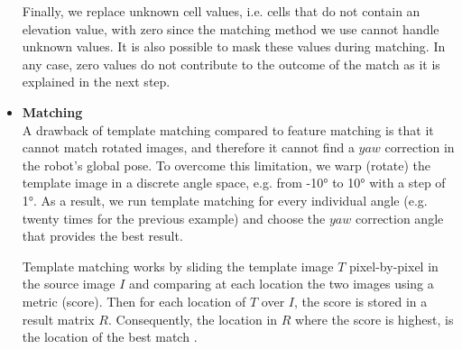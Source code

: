 \begin{itemize}

        Finally, we replace unknown cell values, i.e. cells that do not
        contain an elevation value, with zero since the matching
        method we use cannot handle unknown values. It is also possible
        to mask these values during matching. In any case, zero values
        do not contribute to the outcome of the match as it is explained
        in the next step.

    \item \textbf{Matching} \\
        A drawback of template matching compared to feature matching is that
        it cannot match rotated images, and therefore it cannot find a
        $yaw$ correction in the robot's global pose.
        To overcome this limitation, we warp (rotate) the template image
        in a discrete angle space, e.g. from \ang{-10} to \ang{10} with
        a step of \ang{1}. As a result, we run template matching for every
        individual angle (e.g. twenty times for the previous example) and
        choose the $yaw$ correction angle that provides the best result.

        Template matching works by sliding the template image $T$
        pixel-by-pixel in the source image $I$ and comparing at each
        location the two images using a metric (score).
        Then for each location of $T$ over $I$, the score is stored in a
        result matrix $R$.
        Consequently, the location in $R$ where the score is highest,
        is the location of the best match \parencite{Hashemi2016}.


\end{itemize}

